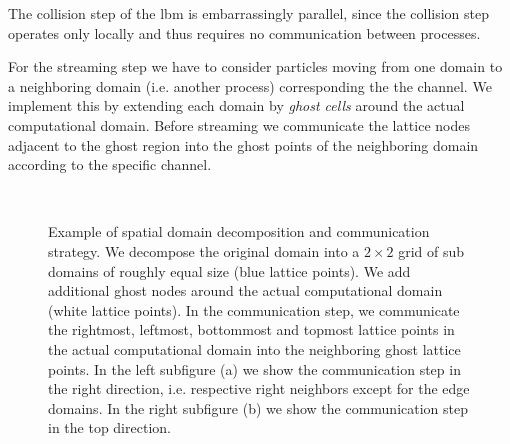 \documentclass[a4paper,11pt, footsepline]{book}
\newcommand{\rulesep}{\unskip\ \vrule\ }
\begin{document}
The collision step of the \ac{lbm} is embarrassingly parallel, since the collision step operates only locally and thus requires no communication between processes.

For the streaming step we have to consider particles moving from one domain to a neighboring domain (i.e. another process) corresponding the the channel. We implement this by extending each domain by \textit{ghost cells} around the actual computational domain. Before streaming we communicate the lattice nodes adjacent to the ghost region into the ghost points of the neighboring domain according to the specific channel. 

\begin{figure}
  \begin{center}
\rulesep
   \caption{Example of spatial domain decomposition and communication strategy. We decompose the original domain into a $2\times 2$ grid of sub domains of roughly equal size (blue lattice points). We add additional ghost nodes around the actual computational domain (white lattice points). In the communication step, we communicate the rightmost, leftmost, bottommost and topmost lattice points in the actual computational domain into the neighboring ghost lattice points. In the left subfigure (a) we show the communication step in the right direction, i.e. respective  right neighbors except for the edge domains. In the right subfigure (b) we show the communication step in the top direction.}
  \label{fig:parallelizationScheme}
  \end{center}
\end{figure}
\end{document}
